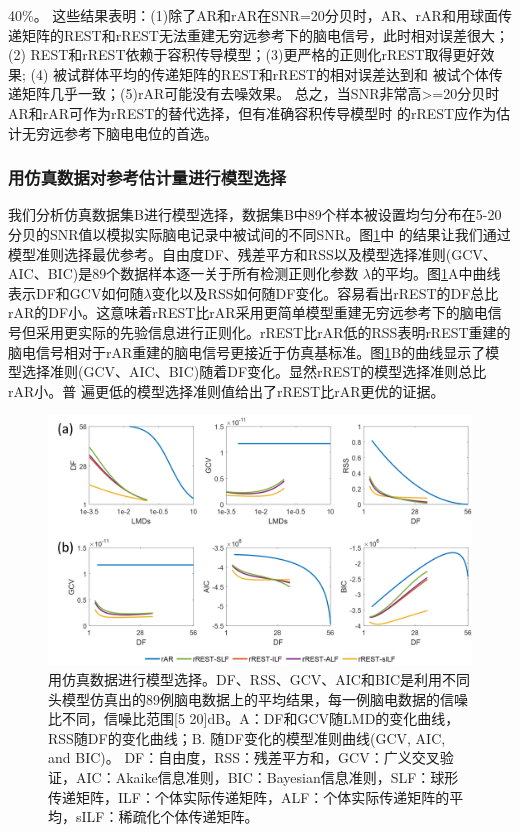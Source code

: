 40\%。
这些结果表明：(1)除了AR和rAR在SNR=20分贝时，AR、rAR和用球面传递矩阵的REST和rREST无法重建无穷远参考下的脑电信号，此时相对误差很大；(2) REST和rREST依赖于容积传导模型；(3)更严格的正则化rREST取得更好效果; (4) 被试群体平均的传递矩阵的REST和rREST的相对误差达到和
被试个体传递矩阵几乎一致；(5)rAR可能没有去噪效果。 总之，当SNR非常高>=20分贝时AR和rAR可作为rREST的替代选择，但有准确容积传导模型时
的rREST应作为估计无穷远参考下脑电电位的首选。

\subsubsection{用仿真数据对参考估计量进行模型选择}
我们分析仿真数据集B进行模型选择，数据集B中89个样本被设置均匀分布在5-20分贝的SNR值以模拟实际脑电记录中被试间的不同SNR。图\ref{3:5}中
的结果让我们通过模型准则选择最优参考。自由度DF、残差平方和RSS以及模型选择准则(GCV、AIC、BIC)是89个数据样本逐一关于所有检测正则化参数
$\lambda$的平均。图\ref{3:5}A中曲线表示DF和GCV如何随$\lambda$变化以及RSS如何随DF变化。容易看出rREST的DF总比rAR的DF小。这意味着rREST比rAR采用更简单模型重建无穷远参考下的脑电信号但采用更实际的先验信息进行正则化。rREST比rAR低的RSS表明rREST重建的脑电信号相对于rAR重建的脑电信号更接近于仿真基标准。图\ref{3:5}B的曲线显示了模型选择准则(GCV、AIC、BIC)随着DF变化。显然rREST的模型选择准则总比rAR小。普
遍更低的模型选择准则值给出了rREST比rAR更优的证据。
\begin{figure}[!h]
	\centering
	\includegraphics[width=15cm]{pic/Frontier/figure5.png}
	\caption{用仿真数据进行模型选择。DF、RSS、GCV、AIC和BIC是利用不同头模型仿真出的89例脑电数据上的平均结果，每一例脑电数据的信噪比不同，信噪比范围[5 20]dB。A：DF和GCV随LMD的变化曲线，RSS随DF的变化曲线；B. 随DF变化的模型准则曲线(GCV, AIC, and BIC)。 DF：自由度，RSS：残差平方和，GCV：广义交叉验证，AIC：Akaike信息准则，BIC：Bayesian信息准则，SLF：球形传递矩阵，ILF：个体实际传递矩阵，ALF：个体实际传递矩阵的平均，sILF：稀疏化个体传递矩阵。}
	\label{3:5}
\end{figure}

